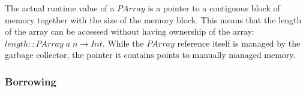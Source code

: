 \documentclass[acmsmall,usenames,dvipsnames,natbib=false,acmthm=false,screen]{acmart}
\newcommand{\Conid}[1]{\mathit{#1}}
\newcommand{\Varid}[1]{\mathit{#1}}
\newcommand{\csongor}[2][1=]{}
\theoremstyle{acmplain}
\theoremstyle{acmdefinition}
\begin{document}
The actual runtime value of a \ensuremath{\Conid{PArray}} is a pointer to a contiguous block of
memory together with the size of the memory block. This means that the length of the
array can be accessed without having ownership of the array: \ensuremath{\Varid{length}\mathbin{::}\Conid{PArray}\;\Varid{a}\;\Varid{n}\to \Conid{Int}}.
While the \ensuremath{\Conid{PArray}} reference itself is managed by the garbage collector, the
pointer it contains points to manually managed memory.








\subsubsection{Borrowing}
\end{document}
